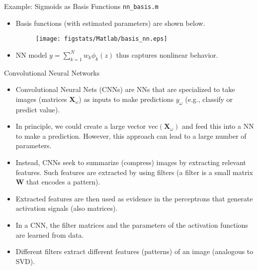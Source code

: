 \documentclass[handout,9pt]{beamer}
\begin{document}
\begin{frame}{Example: Sigmoids as Basis Functions \footnotesize{\texttt{nn\_basis.m}}}

\begin{itemize}
\item Basis functions (with estimated parameters) are shown below. 



\begin{figure}[!htb]
    \centering
	\texttt{[image: figstats/Matlab/basis\_nn.eps]}
\end{figure}

\item NN model $y=\sum_{k=1}^Nw_k\phi_k(z)$ thus captures nonlinear behavior.  
\end{itemize}

\end{frame}

\begin{frame}{Convolutional Neural Networks}

\begin{itemize}
   \setlength{\itemsep}{10pt}
\item Convolutional Neural Nets (CNNs) are NNs that are specialized to take images (matrices $\mathbf{X}_\omega$) as inputs to make predictions $y_\omega$ (e.g., classify or predict value). 
\item In principle, we could create a large vector $\textrm{vec}(\mathbf{X}_\omega)$ and feed this into a NN to make a prediction. However, this approach can lead to a large number of parameters. 
\item Instead, CNNs seek to summarize (compress) images by extracting relevant features. Such features are extracted by using filters (a filter is a small matrix $\mathbf{W}$ that encodes a pattern). 
\item Extracted features are then used as evidence in the perceptrons that generate activation signals (also matrices).
\item In a CNN, the filter matrices and the parameters of the activation functions are learned from data.
\item Different filters extract different features (patterns) of an image (analogous to SVD). 
\end{itemize}


\end{frame}
\end{document}
